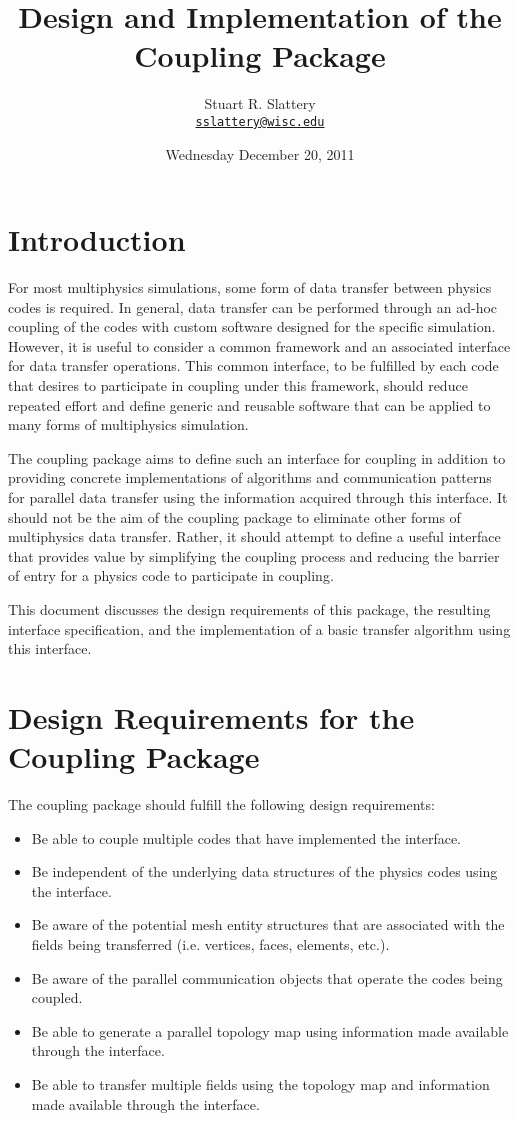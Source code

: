 \documentclass[letterpaper]{article}
\author{Stuart R. Slattery
  \\ \href{mailto:sslattery@wisc.edu}{\texttt{sslattery@wisc.edu}}
}
\date{Wednesday December 20, 2011}
\title{Design and Implementation of the Coupling Package}
\begin{document}
\maketitle

\section{Introduction}
For most multiphysics simulations, some form of data transfer between
physics codes is required. In general, data transfer can be performed
through an ad-hoc coupling of the codes with custom software designed
for the specific simulation. However, it is useful to consider a
common framework and an associated interface for data transfer
operations. This common interface, to be fulfilled by each code that
desires to participate in coupling under this framework, should reduce
repeated effort and define generic and reusable software that can be
applied to many forms of multiphysics simulation.

The coupling package aims to define such an interface for coupling in
addition to providing concrete implementations of algorithms and
communication patterns for parallel data transfer using the
information acquired through this interface. It should not be the aim
of the coupling package to eliminate other forms of multiphysics data
transfer. Rather, it should attempt to define a useful interface that
provides value by simplifying the coupling process and reducing the
barrier of entry for a physics code to participate in coupling. 

This document discusses the design requirements of this package, the
resulting interface specification, and the implementation of a basic
transfer algorithm using this interface.

\section{Design Requirements for the Coupling Package}
The coupling package should fulfill the following design
requirements:

\begin{itemize}
\item Be able to couple multiple codes that have implemented the
  interface.
\item Be independent of the underlying data structures of the physics
  codes using the interface.
\item Be aware of the potential mesh entity structures that are
  associated with the fields being transferred (i.e. vertices, faces,
  elements, etc.).
\item Be aware of the parallel communication objects that operate the
  codes being coupled.
\item Be able to generate a parallel topology map using information
  made available through the interface.
\item Be able to transfer multiple fields using the topology map and
  information made available through the interface.
\end{itemize}
\end{document}
